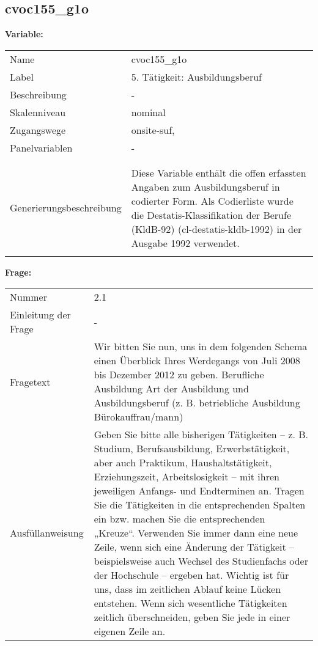 	
	
	\subsection{cvoc155\_g1o}
	\label{subSection:cvoc155_g1o}

	\noindent\textbf{Variable:}\\
		\begin{tabular}{lL{11.3cm}}
			\label{tableVariable:cvoc155_g1o}
			Name & cvoc155\_g1o \\
			Label & 5. Tätigkeit: Ausbildungsberuf \\
			Beschreibung & - \\
			Skalenniveau & nominal \\
			Zugangswege &
				onsite-suf,
 \\
			Panelvariablen & -
			 \\
			 \\
 \\
					Generierungsbeschreibung & Diese Variable enthält die offen erfassten Angaben zum Ausbildungsberuf in codierter Form. Als Codierliste wurde die Destatis-Klassifikation der Berufe (KldB-92) (cl-destatis-kldb-1992) in der Ausgabe 1992 verwendet. 
				 \\	
			 \\
		\end{tabular}

		\vspace*{1 cm}
		\noindent\textbf{Frage:}\\
		\begin{tabular}{lL{11.3cm}}
			\label{tableQuestion:cvoc155_g1o}
			Nummer & 2.1 \\
			Einleitung der Frage & - \\
			Fragetext & Wir bitten Sie nun, uns in dem folgenden Schema einen Überblick Ihres Werdegangs von Juli 2008 bis Dezember 2012 zu geben.
Berufliche Ausbildung
Art der Ausbildung und Ausbildungsberuf
(z. B. betriebliche Ausbildung Bürokauffrau/mann) \\
			Ausfüllanweisung & Geben Sie bitte alle bisherigen Tätigkeiten – z. B. Studium, Berufsausbildung, Erwerbstätigkeit, aber auch Praktikum, Haushaltstätigkeit,
Erziehungszeit, Arbeitslosigkeit – mit ihren jeweiligen Anfangs- und Endterminen an. Tragen Sie die Tätigkeiten in die entsprechenden Spalten ein bzw. machen Sie die entsprechenden „Kreuze“. Verwenden Sie immer dann eine neue Zeile, wenn sich eine Änderung der Tätigkeit – beispielsweise auch Wechsel des Studienfachs oder der Hochschule – ergeben hat. Wichtig ist für uns, dass im zeitlichen Ablauf keine Lücken entstehen. Wenn sich wesentliche Tätigkeiten zeitlich überschneiden, geben Sie jede in einer eigenen Zeile an. \\
		\end{tabular}





